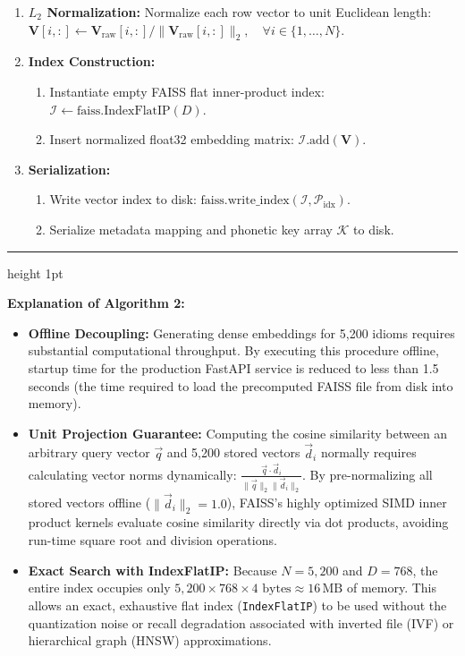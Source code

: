 \documentclass[12pt,a4paper]{article}
\begin{document}
\begin{table}[H]
\begin{minipage}{0.96\linewidth}
\begin{enumerate}
  $\mathbf{V}_{\mathrm{raw}} \leftarrow \mathcal{E}.\mathrm{encode}([S_1, \dots, S_N], \mathrm{batch\_size}=32) \in \mathbb{R}^{N \times D}$.
  \item \textbf{$L_2$ Normalization:} Normalize each row vector to unit Euclidean length:\\
  $\mathbf{V}[i, :] \leftarrow \mathbf{V}_{\mathrm{raw}}[i, :] / \|\mathbf{V}_{\mathrm{raw}}[i, :]\|_2, \quad \forall i \in \{1, \dots, N\}$.
  \item \textbf{Index Construction:}
  \begin{enumerate}
    \item Instantiate empty FAISS flat inner-product index: $\mathcal{I} \leftarrow \mathrm{faiss.IndexFlatIP}(D)$.
    \item Insert normalized float32 embedding matrix: $\mathcal{I}.\mathrm{add}(\mathbf{V})$.
  \end{enumerate}
  \item \textbf{Serialization:}
  \begin{enumerate}
    \item Write vector index to disk: $\mathrm{faiss.write\_index}(\mathcal{I}, \mathcal{P}_{\mathrm{idx}})$.
    \item Serialize metadata mapping and phonetic key array $\mathcal{K}$ to disk.
  \end{enumerate}
\end{enumerate}
\vspace{4pt}
\end{minipage}
\hrule height 1pt
\end{table}

\textbf{Explanation of Algorithm 2:}
\begin{itemize}
  \item \textbf{Offline Decoupling:} Generating dense embeddings for 5,200 idioms requires substantial computational throughput. By executing this procedure offline, startup time for the production FastAPI service is reduced to less than 1.5 seconds (the time required to load the precomputed FAISS file from disk into memory).
  \item \textbf{Unit Projection Guarantee:} Computing the cosine similarity between an arbitrary query vector $\vec{q}$ and 5,200 stored vectors $\vec{d}_i$ normally requires calculating vector norms dynamically: $\frac{\vec{q} \cdot \vec{d}_i}{\|\vec{q}\|_2 \|\vec{d}_i\|_2}$. By pre-normalizing all stored vectors offline ($\|\vec{d}_i\|_2 = 1.0$), FAISS's highly optimized SIMD inner product kernels evaluate cosine similarity directly via dot products, avoiding run-time square root and division operations.
  \item \textbf{Exact Search with IndexFlatIP:} Because $N = 5{,}200$ and $D = 768$, the entire index occupies only $5{,}200 \times 768 \times 4 \text{ bytes} \approx 16\,\text{MB}$ of memory. This allows an exact, exhaustive flat index (\texttt{IndexFlatIP}) to be used without the quantization noise or recall degradation associated with inverted file (IVF) or hierarchical graph (HNSW) approximations.
\end{itemize}
\end{document}
